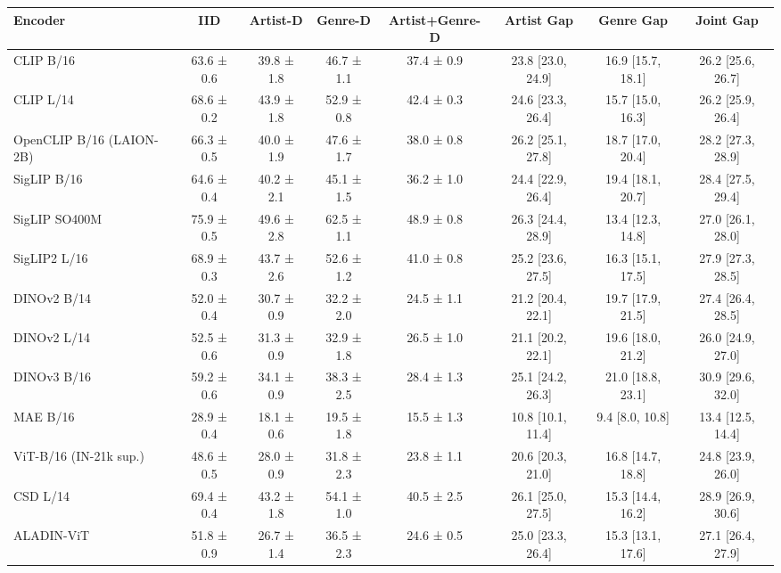 \begin{tabular}{lccccccc}
\toprule
Encoder & IID & Artist-D & Genre-D & Artist+Genre-D & Artist Gap & Genre Gap & Joint Gap \\
\midrule
CLIP B/16 & 63.6 ± 0.6 & 39.8 ± 1.8 & 46.7 ± 1.1 & 37.4 ± 0.9 & 23.8 [23.0, 24.9] & 16.9 [15.7, 18.1] & 26.2 [25.6, 26.7] \\
CLIP L/14 & 68.6 ± 0.2 & 43.9 ± 1.8 & 52.9 ± 0.8 & 42.4 ± 0.3 & 24.6 [23.3, 26.4] & 15.7 [15.0, 16.3] & 26.2 [25.9, 26.4] \\
OpenCLIP B/16 (LAION-2B) & 66.3 ± 0.5 & 40.0 ± 1.9 & 47.6 ± 1.7 & 38.0 ± 0.8 & 26.2 [25.1, 27.8] & 18.7 [17.0, 20.4] & 28.2 [27.3, 28.9] \\
SigLIP B/16 & 64.6 ± 0.4 & 40.2 ± 2.1 & 45.1 ± 1.5 & 36.2 ± 1.0 & 24.4 [22.9, 26.4] & 19.4 [18.1, 20.7] & 28.4 [27.5, 29.4] \\
SigLIP SO400M & 75.9 ± 0.5 & 49.6 ± 2.8 & 62.5 ± 1.1 & 48.9 ± 0.8 & 26.3 [24.4, 28.9] & 13.4 [12.3, 14.8] & 27.0 [26.1, 28.0] \\
SigLIP2 L/16 & 68.9 ± 0.3 & 43.7 ± 2.6 & 52.6 ± 1.2 & 41.0 ± 0.8 & 25.2 [23.6, 27.5] & 16.3 [15.1, 17.5] & 27.9 [27.3, 28.5] \\
DINOv2 B/14 & 52.0 ± 0.4 & 30.7 ± 0.9 & 32.2 ± 2.0 & 24.5 ± 1.1 & 21.2 [20.4, 22.1] & 19.7 [17.9, 21.5] & 27.4 [26.4, 28.5] \\
DINOv2 L/14 & 52.5 ± 0.6 & 31.3 ± 0.9 & 32.9 ± 1.8 & 26.5 ± 1.0 & 21.1 [20.2, 22.1] & 19.6 [18.0, 21.2] & 26.0 [24.9, 27.0] \\
DINOv3 B/16 & 59.2 ± 0.6 & 34.1 ± 0.9 & 38.3 ± 2.5 & 28.4 ± 1.3 & 25.1 [24.2, 26.3] & 21.0 [18.8, 23.1] & 30.9 [29.6, 32.0] \\
MAE B/16 & 28.9 ± 0.4 & 18.1 ± 0.6 & 19.5 ± 1.8 & 15.5 ± 1.3 & 10.8 [10.1, 11.4] & 9.4 [8.0, 10.8] & 13.4 [12.5, 14.4] \\
ViT-B/16 (IN-21k sup.) & 48.6 ± 0.5 & 28.0 ± 0.9 & 31.8 ± 2.3 & 23.8 ± 1.1 & 20.6 [20.3, 21.0] & 16.8 [14.7, 18.8] & 24.8 [23.9, 26.0] \\
CSD L/14 & 69.4 ± 0.4 & 43.2 ± 1.8 & 54.1 ± 1.0 & 40.5 ± 2.5 & 26.1 [25.0, 27.5] & 15.3 [14.4, 16.2] & 28.9 [26.9, 30.6] \\
ALADIN-ViT & 51.8 ± 0.9 & 26.7 ± 1.4 & 36.5 ± 2.3 & 24.6 ± 0.5 & 25.0 [23.3, 26.4] & 15.3 [13.1, 17.6] & 27.1 [26.4, 27.9] \\
\bottomrule
\end{tabular}

